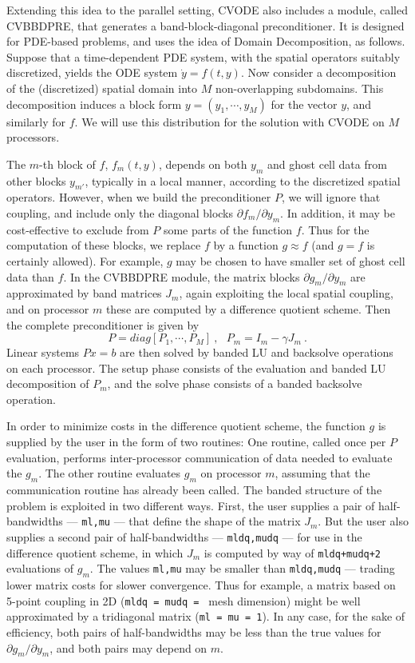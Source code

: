 Extending this idea to the parallel setting, CVODE also includes a
module, called CVBBDPRE, that generates a band-block-diagonal
preconditioner.  It is designed for PDE-based problems, and uses the
idea of Domain Decomposition, as follows.  Suppose that a
time-dependent PDE system, with the spatial operators suitably
discretized, yields the ODE system $\dot{y} = f(t,y)$.  Now consider a
decomposition of the (discretized) spatial domain into $M$
non-overlapping subdomains.  This decomposition induces a block form
$y = (y_1,\cdots,y_M)$ for the vector $y$, and similarly for $f$.  We
will use this distribution for the solution with CVODE on $M$
processors.

The $m$-th block of $f$, $f_m(t,y)$, depends on both $y_m$ and ghost
cell data from other blocks $y_{m'}$, typically in a local manner,
according to the discretized spatial operators.  However, when we
build the preconditioner $P$, we will ignore that coupling, and
include only the diagonal blocks $\partial f_m / \partial y_m$.  In
addition, it may be cost-effective to exclude from $P$ some parts of
the function $f$.  Thus for the computation of these blocks, we
replace $f$ by a function $g \approx f$ (and $g = f$ is certainly
allowed).  For example, $g$ may be chosen to have smaller set of ghost
cell data than $f$.  In the CVBBDPRE module, the matrix blocks
$\partial g_m/\partial y_m$ are approximated by band matrices $J_m$,
again exploiting the local spatial coupling, and on processor $m$
these are computed by a difference quotient scheme.  Then the complete
preconditioner is given by
\[ P = diag[P_1,\cdots,P_M] ~,~~~ P_m = I_m - \gamma J_m ~. \]
Linear systems $Px = b$ are then solved by banded LU and backsolve
operations on each processor.  The setup phase consists of the
evaluation and banded LU decomposition of $P_m$, and the solve phase
consists of a banded backsolve operation.

In order to minimize costs in the difference quotient scheme, the
function $g$ is supplied by the user in the form of two routines: One
routine, called once per $P$ evaluation, performs inter-processor
communication of data needed to evaluate the $g_m$.  The other routine
evaluates $g_m$ on processor $m$, assuming that the communication
routine has already been called.  The banded structure of the problem
is exploited in two different ways.  First, the user supplies a pair of
half-bandwidths --- {\tt ml,mu} --- that define the shape of the
matrix $J_m$.  But the user also supplies a second pair of
half-bandwidths --- {\tt mldq,mudq} --- for use in the difference
quotient scheme, in which $J_m$ is computed by way of 
{\tt mldq+mudq+2} evaluations of $g_m$.  The values {\tt ml,mu} may be
smaller than {\tt mldq,mudq} --- trading lower matrix costs for slower
convergence.  Thus for example, a matrix based on 5-point coupling in
2D ({\tt mldq = mudq = } mesh dimension) might be well approximated by
a tridiagonal matrix ({\tt ml = mu = 1}).  In any case, for the sake
of efficiency, both pairs of half-bandwidths may be less than the true
values for $\partial g_m /\partial y_m$, and both pairs may depend on
$m$.

